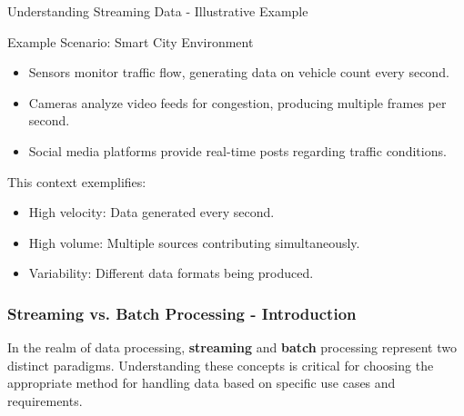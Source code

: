 \documentclass[aspectratio=169]{beamer}
\begin{document}
\begin{frame}[fragile]{Understanding Streaming Data - Illustrative Example}
    \begin{block}{Example Scenario: Smart City Environment}
        \begin{itemize}
            \item Sensors monitor traffic flow, generating data on vehicle count every second.
            \item Cameras analyze video feeds for congestion, producing multiple frames per second.
            \item Social media platforms provide real-time posts regarding traffic conditions.
        \end{itemize}
        \vspace{0.5cm}
        This context exemplifies:
        \begin{itemize}
            \item High velocity: Data generated every second.
            \item High volume: Multiple sources contributing simultaneously.
            \item Variability: Different data formats being produced.
        \end{itemize}
    \end{block}
\end{frame}

\begin{frame}[fragile]
    \frametitle{Streaming vs. Batch Processing - Introduction}
    In the realm of data processing, \textbf{streaming} and \textbf{batch} processing represent two distinct paradigms. Understanding these concepts is critical for choosing the appropriate method for handling data based on specific use cases and requirements.
\end{frame}
\end{document}
